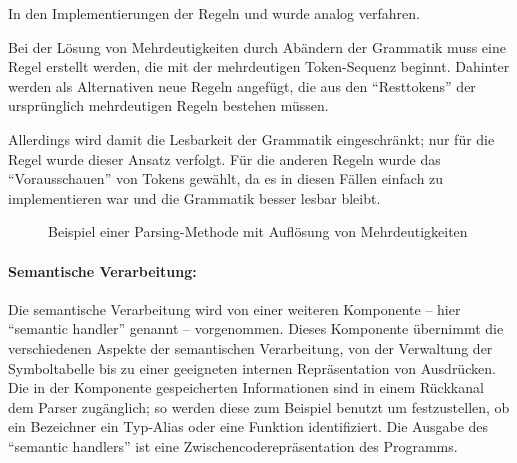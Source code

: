 \documentclass[twoside,a4paper,fleqn,12pt]{book}
\begin{document}
In den Implementierungen der Regeln  und  wurde analog verfahren.

Bei der Lösung von Mehrdeutigkeiten durch Abändern der Grammatik muss eine Regel erstellt werden,
die mit der mehrdeutigen Token-Sequenz beginnt. Dahinter werden als Alternativen neue Regeln angefügt,
die aus den "`Resttokens"' der ursprünglich mehrdeutigen Regeln bestehen müssen. %

Allerdings wird damit die Lesbarkeit der Grammatik eingeschränkt; nur für die Regel  wurde dieser Ansatz verfolgt.
Für die anderen Regeln wurde das "`Vorausschauen"' von Tokens gewählt, da es in diesen Fällen einfach zu implementieren war
und die Grammatik besser lesbar bleibt.

\begin{figure}[!h]
   \centering
  
  \caption{Beispiel einer Parsing-Methode mit Auflösung von Mehrdeutigkeiten}
  \label{fig:ParseProgramStatements}
\end{figure}

\paragraph{Semantische Verarbeitung:}
Die semantische Verarbeitung wird von einer weiteren Komponente -- hier ``semantic handler'' genannt -- vorgenommen. 
Dieses Komponente übernimmt die verschiedenen Aspekte der semantischen Verarbeitung, von der Verwaltung der
Symboltabelle bis zu einer geeigneten internen Repräsentation von Ausdrücken. Die in der Komponente gespeicherten Informationen sind
in einem Rückkanal dem Parser zugänglich; so werden diese zum Beispiel benutzt um festzustellen, ob ein Bezeichner ein
Typ-Alias oder eine Funktion identifiziert.
Die Ausgabe des ``semantic handlers'' ist eine Zwischencoderepräsentation des Programms.

\end{document}
